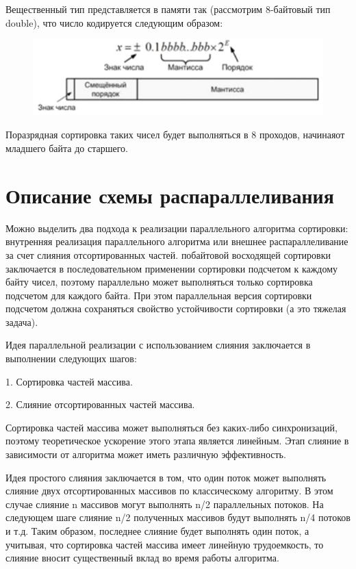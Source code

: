 \documentclass{report}
\begin{document}
Вещественный тип представляется в памяти так (рассмотрим 8-байтовый тип double), что число кодируется следующим образом: 

\begin{figure}[htp]
    \centering
    \includegraphics[width=14cm]{images/image8.png}
    \label{fig:galaxy}
\end{figure}
Поразрядная сортировка таких чисел будет выполняться в 8 проходов, начинаяот младшего байта до старшего.


\newpage

\section*{Описание схемы распараллеливания}

\par Можно выделить два подхода к реализации параллельного алгоритма сортировки: внутренняя реализация параллельного алгоритма или внешнее распараллеливание за счет слияния отсортированных частей.
 побайтовой восходящей сортировки заключается в последовательном применении сортировки подсчетом к каждому байту чисел, поэтому параллельно может выполняться только сортировка подсчетом для каждого байта. При этом параллельная версия сортировки подсчетом должна сохраняться свойство устойчивости сортировки (а это тяжелая задача).
\par Идея параллельной реализации с использованием слияния заключается в выполнении следующих шагов:

1. Сортировка частей массива.
\par2. Слияние отсортированных частей массива.

\par Сортировка частей массива может выполняться без каких-либо синхронизаций, поэтому теоретическое ускорение этого этапа является линейным. Этап слияние в зависимости от алгоритма может иметь различную эффективность.

\par Идея простого слияния заключается в том, что один поток может выполнять слияние двух отсортированных массивов по классическому алгоритму. В этом случае слияние n массивов могут выполнять n/2 параллельных потоков. На следующем шаге слияние n/2 полученных массивов будут выполнять n/4 потоков и т.д. Таким образом, последнее слияние будет выполнять один поток, а учитывая, что сортировка частей массива имеет линейную трудоемкость, то слияние вносит существенный вклад во время работы алгоритма.
\end{document}
